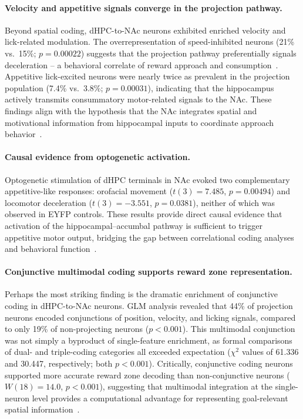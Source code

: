 \documentclass[11pt]{article}
\begin{document}
\paragraph{Velocity and appetitive signals converge in the projection pathway.}
Beyond spatial coding, dHPC-to-NAc neurons exhibited enriched velocity and lick-related modulation. The overrepresentation of speed-inhibited neurons (21\% vs.\ 15\%; $p=0.00022$) suggests that the projection pathway preferentially signals deceleration -- a behavioral correlate of reward approach and consumption~\citep{markus1995}. Appetitive lick-excited neurons were nearly twice as prevalent in the projection population (7.4\% vs.\ 3.8\%; $p=0.00031$), indicating that the hippocampus actively transmits consummatory motor-related signals to the NAc. These findings align with the hypothesis that the NAc integrates spatial and motivational information from hippocampal inputs to coordinate approach behavior~\citep{mogenson1980, pennartz2011, floresco2015}.

\paragraph{Causal evidence from optogenetic activation.}
Optogenetic stimulation of dHPC terminals in NAc evoked two complementary appetitive-like responses: orofacial movement ($t(3)=7.485$, $p=0.00494$) and locomotor deceleration ($t(3)=-3.551$, $p=0.0381$), neither of which was observed in EYFP controls. These results provide direct causal evidence that activation of the hippocampal--accumbal pathway is sufficient to trigger appetitive motor output, bridging the gap between correlational coding analyses and behavioral function~\citep{boyden2005, britt2012, leshan2014}.

\paragraph{Conjunctive multimodal coding supports reward zone representation.}
Perhaps the most striking finding is the dramatic enrichment of conjunctive coding in dHPC-to-NAc neurons. GLM analysis revealed that 44\% of projection neurons encoded conjunctions of position, velocity, and licking signals, compared to only 19\% of non-projecting neurons ($p<0.001$). This multimodal conjunction was not simply a byproduct of single-feature enrichment, as formal comparisons of dual- and triple-coding categories all exceeded expectation ($\chi^{2}$ values of 61.336 and 30.447, respectively; both $p<0.001$). Critically, conjunctive coding neurons supported more accurate reward zone decoding than non-conjunctive neurons ($W(18)=14.0$, $p<0.001$), suggesting that multimodal integration at the single-neuron level provides a computational advantage for representing goal-relevant spatial information~\citep{eichenbaum2014, trouche2019}.
\end{document}
